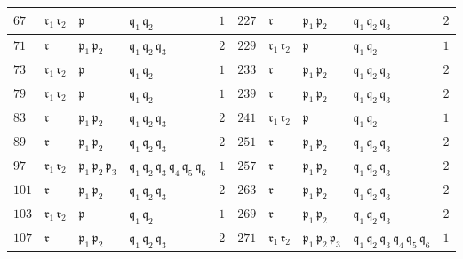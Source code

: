 \begin{figure}
\begin{center}
\begin{tabular}{x{0.75cm}x{1cm}x{1.25cm}x{2.5cm}x{0.75cm}x{0.75cm}x{1cm}x{1.25cm}x{2.5cm}x{0.75cm}}
      \hline
      $67$ & $\mathfrak{r}_1\,\mathfrak{r}_2$ & $\mathfrak{p}$ & $\mathfrak{q}_1\,\mathfrak{q}_2$ & $1$ & $227$ & $\mathfrak{r}$ & $\mathfrak{p}_1\,\mathfrak{p}_2$ & $\mathfrak{q}_1\,\mathfrak{q}_2\,\mathfrak{q}_3$ & $2$ \tabularnewline
      \hline
      $71$ & $\mathfrak{r}$ & $\mathfrak{p}_1\,\mathfrak{p}_2$ & $\mathfrak{q}_1\,\mathfrak{q}_2\,\mathfrak{q}_3$ & $2$ & $229$ & $\mathfrak{r}_1\,\mathfrak{r}_2$ & $\mathfrak{p}$ & $\mathfrak{q}_1\,\mathfrak{q}_2$ & $1$ \tabularnewline
      \hline
      $73$ & $\mathfrak{r}_1\,\mathfrak{r}_2$ & $\mathfrak{p}$ & $\mathfrak{q}_1\,\mathfrak{q}_2$ & $1$ & $233$ & $\mathfrak{r}$ & $\mathfrak{p}_1\,\mathfrak{p}_2$ & $\mathfrak{q}_1\,\mathfrak{q}_2\,\mathfrak{q}_3$ & $2$ \tabularnewline
      \hline
      $79$ & $\mathfrak{r}_1\,\mathfrak{r}_2$ & $\mathfrak{p}$ & $\mathfrak{q}_1\,\mathfrak{q}_2$ & $1$ & $239$ & $\mathfrak{r}$ & $\mathfrak{p}_1\,\mathfrak{p}_2$ & $\mathfrak{q}_1\,\mathfrak{q}_2\,\mathfrak{q}_3$ & $2$ \tabularnewline
      \hline
      $83$ & $\mathfrak{r}$ & $\mathfrak{p}_1\,\mathfrak{p}_2$ & $\mathfrak{q}_1\,\mathfrak{q}_2\,\mathfrak{q}_3$ & $2$ & $241$ & $\mathfrak{r}_1\,\mathfrak{r}_2$ & $\mathfrak{p}$ & $\mathfrak{q}_1\,\mathfrak{q}_2$ & $1$ \tabularnewline
      \hline
      $89$ & $\mathfrak{r}$ & $\mathfrak{p}_1\,\mathfrak{p}_2$ & $\mathfrak{q}_1\,\mathfrak{q}_2\,\mathfrak{q}_3$ & $2$ & $251$ & $\mathfrak{r}$ & $\mathfrak{p}_1\,\mathfrak{p}_2$ & $\mathfrak{q}_1\,\mathfrak{q}_2\,\mathfrak{q}_3$ & $2$ \tabularnewline
      \hline
      $97$ & $\mathfrak{r}_1\,\mathfrak{r}_2$ & $\mathfrak{p}_1\,\mathfrak{p}_2\,\mathfrak{p}_3$ & $\mathfrak{q}_1\,\mathfrak{q}_2\,\mathfrak{q}_3\,\mathfrak{q}_4\,\mathfrak{q}_5\,\mathfrak{q}_6$ & $1$ & $257$ & $\mathfrak{r}$ & $\mathfrak{p}_1\,\mathfrak{p}_2$ & $\mathfrak{q}_1\,\mathfrak{q}_2\,\mathfrak{q}_3$ & $2$ \tabularnewline
      \hline
      $101$ & $\mathfrak{r}$ & $\mathfrak{p}_1\,\mathfrak{p}_2$ & $\mathfrak{q}_1\,\mathfrak{q}_2\,\mathfrak{q}_3$ & $2$ & $263$ & $\mathfrak{r}$ & $\mathfrak{p}_1\,\mathfrak{p}_2$ & $\mathfrak{q}_1\,\mathfrak{q}_2\,\mathfrak{q}_3$ & $2$ \tabularnewline
      \hline
      $103$ & $\mathfrak{r}_1\,\mathfrak{r}_2$ & $\mathfrak{p}$ & $\mathfrak{q}_1\,\mathfrak{q}_2$ & $1$ & $269$ & $\mathfrak{r}$ & $\mathfrak{p}_1\,\mathfrak{p}_2$ & $\mathfrak{q}_1\,\mathfrak{q}_2\,\mathfrak{q}_3$ & $2$ \tabularnewline
      \hline
      $107$ & $\mathfrak{r}$ & $\mathfrak{p}_1\,\mathfrak{p}_2$ & $\mathfrak{q}_1\,\mathfrak{q}_2\,\mathfrak{q}_3$ & $2$ & $271$ & $\mathfrak{r}_1\,\mathfrak{r}_2$ & $\mathfrak{p}_1\,\mathfrak{p}_2\,\mathfrak{p}_3$ & $\mathfrak{q}_1\,\mathfrak{q}_2\,\mathfrak{q}_3\,\mathfrak{q}_4\,\mathfrak{q}_5\,\mathfrak{q}_6$ & $1$ \tabularnewline

\end{tabular}
\end{center}
\end{figure}
